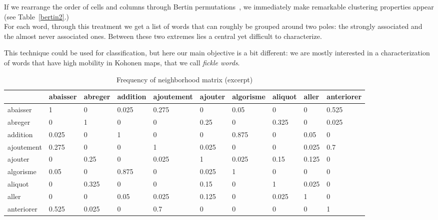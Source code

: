 \documentclass[preprint]{elsarticle}
\begin{document}
If we rearrange the order of cells and columns through Bertin permutations~\cite{Bertin}, we immediately make remarkable clustering properties appear (see Table~\ref{bertin2}.)\\

For each word, through this treatment we get a list of words that can roughly be grouped around two poles: the strongly associated and the almost never associated ones. Between these two extremes lies a central yet difficult to characterize.

This technique could be used for classification, but here our main objective is a bit different: we are mostly interested in a characterization of words that have high mobility in Kohonen maps, that we call \textit{fickle words}.

\label{m1}

\begin{table}
\begin{small}
\begin{tabular}{|l|l|l|l|l|l|l|l|l|l|}
\hline
 & abaisser & abreger & addition & ajoutement & ajouter & algorisme & aliquot & aller & anteriorer \\ \hline
abaisser  & \cellcolor{gris} 1 & 0 & \cellcolor{grisclair} 0.025 & \cellcolor{gris} 0.275 & 0 & \cellcolor{grisclair} 0.05 & 0 & 0 & \cellcolor{gris} 0.525\\ \hline
abreger & 0 & \cellcolor{gris} 1 & 0 & 0 & \cellcolor{gris} 0.25 & 0 & \cellcolor{gris} 0.325 & 0 & \cellcolor{grisclair} 0.025\\ \hline
addition & \cellcolor{grisclair} 0.025 & 0 & \cellcolor{gris} 1 & 0 & 0 & \cellcolor{gris} 0.875 & 0 & \cellcolor{grisclair} 0.05 & 0\\ \hline
ajoutement  & \cellcolor{gris} 0.275 & 0 & 0 & \cellcolor{gris} 1 & \cellcolor{grisclair} 0.025 & 0 & 0 & \cellcolor{grisclair} 0.025 & \cellcolor{gris} 0.7\\ \hline
ajouter & 0 & \cellcolor{gris} 0.25 & 0 & \cellcolor{grisclair} 0.025 & \cellcolor{gris} 1 & \cellcolor{grisclair} 0.025 & \cellcolor{grisclair} 0.15 & \cellcolor{grisclair} 0.125 & 0\\ \hline
algorisme & \cellcolor{grisclair} 0.05 & 0 & \cellcolor{gris} 0.875 & 0 & \cellcolor{grisclair} 0.025 & \cellcolor{gris} 1 & 0 & 0 & 0\\ \hline
aliquot & 0 & \cellcolor{gris} 0.325 & 0 & 0 & \cellcolor{grisclair} 0.15 & 0 & \cellcolor{gris} 1 & \cellcolor{grisclair} 0.025 & 0\\ \hline
aller & 0 & 0 & \cellcolor{grisclair} 0.05 & \cellcolor{grisclair} 0.025 & \cellcolor{grisclair} 0.125 & 0 & \cellcolor{grisclair} 0.025 & \cellcolor{gris} 1 & 0\\ \hline
anteriorer & \cellcolor{gris} 0.525 & \cellcolor{grisclair} 0.025 & 0 & \cellcolor{gris} 0.7 & 0 & 0 & 0 & 0 & \cellcolor{gris} 1 \\ \hline
\end{tabular}
\end{small}
\caption{Frequency of neighborhood matrix (excerpt)}
\label{bertin1}
\end{table}
\end{document}
